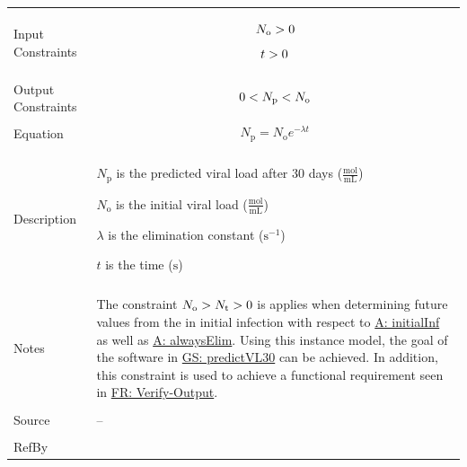 \documentclass[12pt]{article}
\newcommand{\gt}{\ensuremath >}
\newcommand{\lt}{\ensuremath <}
\begin{document}
\begin{minipage}{\textwidth}
\begin{tabular}{>{\raggedright}p{}>{\raggedright\arraybackslash}p{}}
\\ \midrule \\
Input Constraints & \begin{displaymath}
                    {N_{\text{o}}}\gt{}0
                    \end{displaymath}
                    \begin{displaymath}
                    t\gt{}0
                    \end{displaymath}
\\ \midrule \\
Output Constraints & \begin{displaymath}
                     0\lt{}{N_{\text{p}}}\lt{}{N_{\text{o}}}
                     \end{displaymath}
\\ \midrule \\
Equation & \begin{displaymath}
           {N_{\text{p}}}={N_{\text{o}}} e^{-λ t}
           \end{displaymath}
\\ \midrule \\
Description & \begin{symbDescription}
              \item{${N_{\text{p}}}$ is the predicted viral load after 30 days ($\frac{\text{mol}}{\text{mL}}$)}
              \item{${N_{\text{o}}}$ is the initial viral load ($\frac{\text{mol}}{\text{mL}}$)}
              \item{$λ$ is the elimination constant ($\text{s}^{-1}$)}
              \item{$t$ is the time (${\text{s}}$)}
              \end{symbDescription}
\\ \midrule \\
Notes & The constraint ${N_{\text{o}}}\gt{}{N_{\text{t}}}\gt{}0$ is  applies when determining future values from the in initial infection with respect to \hyperref[initialInf]{A: initialInf} as well as  \hyperref[alwaysElim]{A: alwaysElim}. Using this instance model, the goal of the software in  \hyperref[predictVL30]{GS: predictVL30}  can be achieved. In addition, this constraint is used to achieve a functional requirement seen in  \hyperref[verifyOutput]{FR: Verify-Output}.
        
\\ \midrule \\
Source & --
         
\\ \midrule \\
RefBy & 
\\ \bottomrule
\end{tabular}
\end{minipage}
\end{document}
